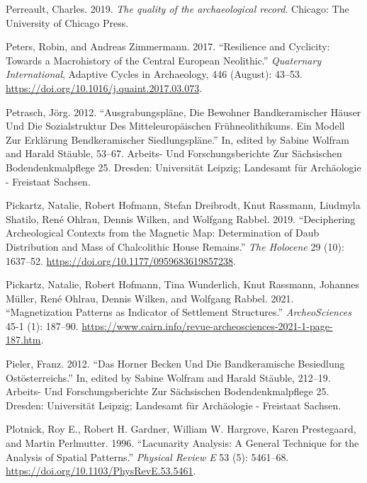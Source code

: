 \documentclass[
  12pt,
  a4paper, twoside]{book}
\newlength{\cslhangindent}
\newlength{\cslentryspacingunit} %
\newenvironment{CSLReferences}[2] %
 {%
  \setlength{\parindent}{0pt}
  \ifodd #1
  \let\oldpar\par
  \def\par{\hangindent=\cslhangindent\oldpar}
  \fi
  \setlength{\parskip}{#2\cslentryspacingunit}
 }%
 {}
\begin{document}
\begin{CSLReferences}{1}{0}
\leavevmode{}%
Perreault, Charles. 2019. \emph{The quality of the archaeological record}. Chicago: The University of Chicago Press.

\leavevmode{}%
Peters, Robin, and Andreas Zimmermann. 2017. {``Resilience and Cyclicity: Towards a Macrohistory of the Central European Neolithic.''} \emph{Quaternary International}, Adaptive Cycles in Archaeology, 446 (August): 43--53. \url{https://doi.org/10.1016/j.quaint.2017.03.073}.

\leavevmode{}%
Petrasch, Jörg. 2012. {``Ausgrabungspläne, Die Bewohner Bandkeramischer Häuser Und Die Sozialstruktur Des Mitteleuropäischen Frühneolithikums. Ein Modell Zur Erklärung Bendkeramischer Siedlungspläne.''} In, edited by Sabine Wolfram and Harald Stäuble, 53--67. Arbeits- Und Forschungsberichte Zur Sächsischen Bodendenkmalpflege 25. Dresden: Universität Leipzig; Landesamt für Archäologie - Freistaat Sachsen.

\leavevmode{}%
Pickartz, Natalie, Robert Hofmann, Stefan Dreibrodt, Knut Rassmann, Liudmyla Shatilo, René Ohlrau, Dennis Wilken, and Wolfgang Rabbel. 2019. {``Deciphering Archeological Contexts from the Magnetic Map: Determination of Daub Distribution and Mass of Chalcolithic House Remains.''} \emph{The Holocene} 29 (10): 1637--52. \url{https://doi.org/10.1177/0959683619857238}.

\leavevmode{}%
Pickartz, Natalie, Robert Hofmann, Tina Wunderlich, Knut Rassmann, Johannes Müller, René Ohlrau, Dennis Wilken, and Wolfgang Rabbel. 2021. {``Magnetization Patterns as Indicator of Settlement Structures.''} \emph{ArcheoSciences} 45-1 (1): 187--90. \url{https://www.cairn.info/revue-archeosciences-2021-1-page-187.htm}.

\leavevmode{}%
Pieler, Franz. 2012. {``Das Horner Becken Und Die Bandkeramische Besiedlung Ostösterreichs.''} In, edited by Sabine Wolfram and Harald Stäuble, 212--19. Arbeits- Und Forschungsberichte Zur Sächsischen Bodendenkmalpflege 25. Dresden: Universität Leipzig; Landesamt für Archäologie - Freistaat Sachsen.

\leavevmode{}%
Plotnick, Roy E., Robert H. Gardner, William W. Hargrove, Karen Prestegaard, and Martin Perlmutter. 1996. {``Lacunarity Analysis: A General Technique for the Analysis of Spatial Patterns.''} \emph{Physical Review E} 53 (5): 5461--68. \url{https://doi.org/10.1103/PhysRevE.53.5461}.


\end{CSLReferences}
\end{document}
